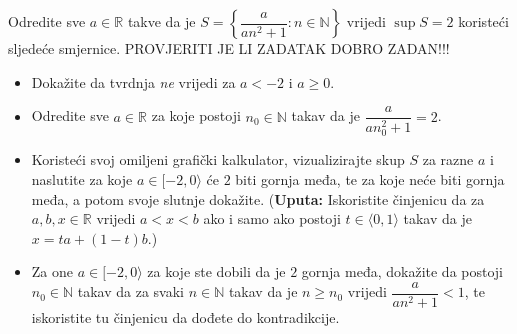 \begin{exercise}{\unskip}
Odredite sve $a\in \mathbb{R}$ takve da je \(S=\left\{\dfrac{a}{an^2+1} : n\in \mathbb{N}\right\}\) vrijedi \(\sup{S}=2\) koristeći sljedeće smjernice. PROVJERITI JE LI ZADATAK DOBRO ZADAN!!!
\begin{itemize}
\item[a)] Dokažite da tvrdnja \textit{ne} vrijedi za $a<-2$ i $a\geq 0$.
\item[b)] Odredite sve $a\in \mathbb{R}$ za koje postoji $n_0\in \mathbb{N}$ takav da je $\dfrac{a}{an_0^2+1}=2$.
\item[c)] Koristeći svoj omiljeni grafički kalkulator, vizualizirajte skup $S$ za razne $a$ i naslutite za koje $a\in [-2, 0\rangle$ će $2$ biti gornja međa, te za koje neće biti gornja međa, a potom svoje slutnje dokažite. (\textbf{Uputa:} Iskoristite činjenicu da za $a, b, x\in \mathbb{R}$ vrijedi $a<x<b$ ako i samo ako postoji $t\in \langle 0, 1\rangle$ takav da je $x=ta+(1-t)b$.)
\item[d)] Za one $a\in [-2, 0\rangle$ za koje ste dobili da je $2$ gornja međa, dokažite da postoji $n_0\in \mathbb{N}$ takav da za svaki $n\in \mathbb{N}$ takav da je $n\geq n_0$ vrijedi $\dfrac{a}{an^2+1}<1$, te iskoristite tu činjenicu da dođete do kontradikcije.
\end{itemize}
\end{exercise}
